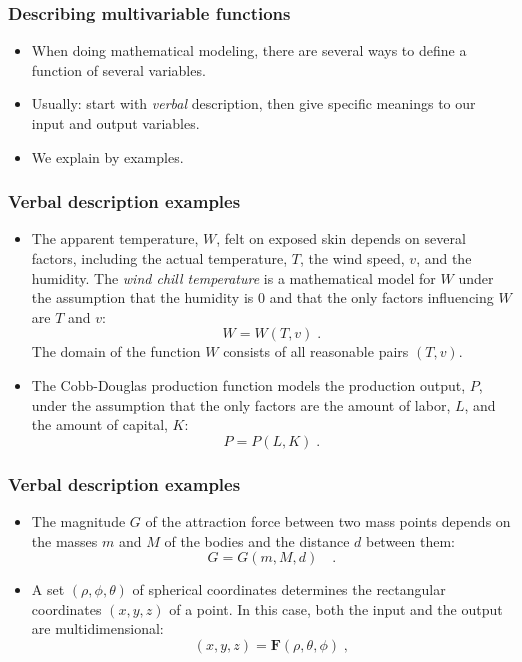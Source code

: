 \begin{frame}\frametitle{Describing multivariable functions}
\begin{itemize}
\item When doing mathematical modeling, there are several ways to define a function of several variables. 
\item<2-> Usually: start with \emph{verbal} description, then give specific meanings
to our input and output variables. 
\item<3-> We explain by examples.
\end{itemize}
\end{frame}

\begin{frame}\frametitle{Verbal description examples}
\begin{itemize}
\item The apparent temperature, $W$, felt on exposed skin depends on several factors, including the actual temperature, $T$, the wind speed, $v$, and the humidity.  The \emph{wind chill temperature} is a mathematical model  for $W$ under the assumption that the humidity is 0 and  that the only factors influencing $W$ are $T$ and $v$:
\[
W = W(T,v)\; .
\]
The domain of the function $W$ consists of all reasonable pairs $(T,v)$.
\item<2-> The Cobb-Douglas production function models the production output, $P$, under the assumption that the only factors are the amount of labor, $L$, and the amount of capital, $K$:
\[
P=P(L,K) \; .
\]
\end{itemize}

\vskip 8cm %
\end{frame}
\begin{frame}\frametitle{Verbal description examples}
\begin{itemize}
\item The magnitude $G$ of the attraction force between two mass points depends on the masses $m$ and $M$ of the bodies and the distance $d$ between them:
\[
G=G(m,M,d) \quad .
\]
\item<2-> A set $(\rho, \phi, \theta)$ of spherical coordinates determines the rectangular coordinates $(x,y,z)$ of a point. In this case, both the input and the output are multidimensional:
\[
(x,y,z) = \textbf{F}(\rho, \theta, \phi)\; ,
\]

\end{itemize}

\vskip 8cm %

\end{frame}

